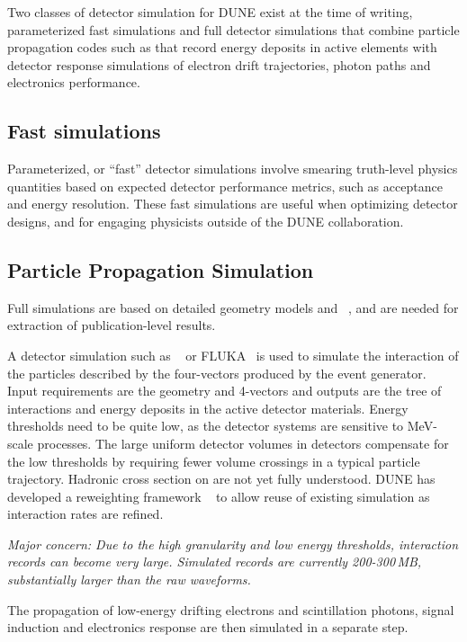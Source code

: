 \documentclass[../main-v1.tex]{subfiles}
\begin{document}
Two classes of detector simulation for DUNE exist at the time of writing, parameterized fast simulations and full detector simulations that combine particle propagation codes such as  that record energy deposits in active elements with detector response simulations of electron drift trajectories, photon paths and electronics performance. 

\subsection{Fast simulations}
Parameterized, or ``fast'' detector simulations involve smearing truth-level physics quantities based on expected detector performance metrics, such as acceptance and energy resolution.  These fast simulations are useful when optimizing detector designs, and for engaging physicists outside of the DUNE collaboration.  

\subsection{Particle Propagation Simulation}
Full simulations are based on detailed geometry models and ~\cite{Agostinelli:2002hh,Allison:2016lfl}, and are needed for extraction of publication-level results.

A detector simulation such as ~\cite{Allison:2016lfl} or FLUKA~\cite{Bohlen:2014buj} is used to simulate the interaction of the particles described by the four-vectors produced by the event generator. Input requirements are the geometry and 4-vectors and outputs are the tree of interactions and energy deposits in the active detector materials. 
Energy thresholds need to be quite low, as the detector systems are sensitive to MeV-scale processes. The large uniform detector volumes in  detectors compensate for the low thresholds by requiring fewer volume crossings in a typical particle trajectory.  
Hadronic cross section on  are not yet fully understood.  DUNE has developed a reweighting framework 
~\cite{Calcutt:2021zck} to allow reuse of existing simulation as interaction rates are refined.

{\it Major concern: 
Due to the high granularity and low energy thresholds, interaction records can become very large. Simulated  records are currently 200-300\,MB, substantially larger than the raw waveforms.}

The propagation of low-energy drifting electrons and scintillation photons, signal induction  and electronics response are then simulated in a separate step.
\end{document}
